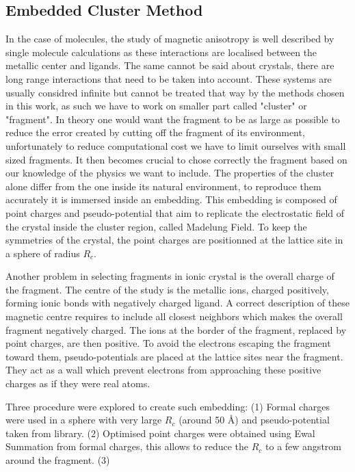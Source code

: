 \documentclass{article}
\begin{document}
\subsection{Embedded Cluster Method}

In the case of molecules, the study of magnetic anisotropy is well described by single molecule calculations as these interactions are localised between the metallic center and ligands. 
The same cannot be said about crystals, there are long range interactions that need to be taken into account. 
These systems are usually considred infinite but cannot be treated that way by the methods chosen in this work, as such we have to work on smaller part called "cluster" or "fragment".
In theory one would want the fragment to be as large as possible to reduce the error created by cutting off the fragment of its environment, unfortunately to reduce computational cost we have to limit ourselves with small sized fragments. 
It then becomes crucial to chose correctly the fragment based on our knowledge of the physics we want to include.
The properties of the cluster alone differ from the one inside its natural environment, to reproduce them accurately it is immersed inside an embedding. 
This embedding is composed of point charges and pseudo-potential that aim to replicate the electrostatic field of the crystal inside the cluster region, called Madelung Field. 
To keep the symmetries of the crystal, the point charges are positionned at the lattice site in a sphere of radius $R_c$. 

Another problem in selecting fragments in ionic crystal is the overall charge of the fragment.
The centre of the study is the metallic ions, charged positively, forming ionic bonds with negatively charged ligand.
A correct description of these magnetic centre requires to include all closest neighbors which makes the overall fragment negatively charged.
The ions at the border of the fragment, replaced by point charges, are then positive.
To avoid the electrons escaping the fragment toward them, pseudo-potentials are placed at the lattice sites near the fragment.
They act as a wall which prevent electrons from approaching these positive charges as if they were real atoms.

Three procedure were explored to create such embedding:
(1) Formal charges were used in a sphere with very large $R_c$ (around 50 \AA{}) and pseudo-potential taken from library.
(2) Optimised point charges were obtained using Ewal Summation from formal charges, this allows to reduce the $R_c$ to a few angstrom around the fragment.
(3)  
\end{document}
